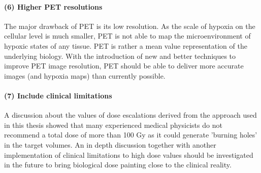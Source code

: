 \paragraph{(6) Higher PET resolutions} The major drawback of PET is its low resolution. As the scale of hypoxia on the cellular level is much smaller, PET is not able to map the microenvironment of hypoxic states of any tissue. PET is rather a mean value representation of the underlying biology. With the introduction of new and better techniques to improve PET image resolution, PET should be able to deliver more accurate images (and hypoxia maps) than currently possible.
\paragraph{(7) Include clinical limitations} A discussion about the values of dose escalations derived from the approach used in this thesis showed that many experienced medical physicists do not recommend a total dose of more than 100 Gy as it could generate 'burning holes' in the target volumes. An in depth discussion together with another implementation of clinical limitations to high dose values should be investigated in the future to bring biological dose painting close to the clinical reality.
